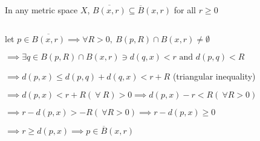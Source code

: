 In any metric space $X$, $\overline{B(x,r)} \subseteq \overline{B}(x,r) $ for all $r \geq 0$


\begin{tcolorbox}
	\begin{solution}$ $
	
		let $p \in \overline{B(x,r)} \implies \forall R > 0,~B(p,R) \cap B(x,r) \neq \emptyset$
		
		$\implies \exists q \in B(p,R) \cap B(x,r) \ni d(q,x) < r \text{ and } d(p,q) < R$
		
		$\implies d(p,x) \leq d(p,q) + d(q,x) < r + R$ (triangular inequality)
		
		$\implies d(p,x) < r+R (~\forall ~R) > 0 \implies d(p,x) - r < R (~\forall R > 0)$
		
		$\implies r - d(p,x) > -R (~\forall R > 0) \implies r - d(p,x) \geq 0$
		
		$\implies r \geq d(p,x) \implies p \in \overline{B}(x,r)$
	\end{solution}
\end{tcolorbox}
